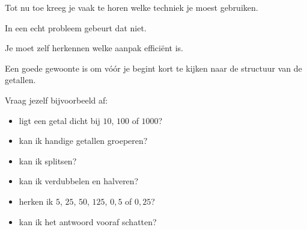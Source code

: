 \documentclass{ximera}
\begin{document}

Tot nu toe kreeg je vaak te horen welke techniek je moest gebruiken.

In een echt probleem gebeurt dat niet.

Je moet zelf herkennen welke aanpak efficiënt is.

Een goede gewoonte is om vóór je begint kort te kijken naar de structuur van
de getallen.

Vraag jezelf bijvoorbeeld af:

\begin{itemize}
    \item ligt een getal dicht bij \(10\), \(100\) of \(1000\)?
    \item kan ik handige getallen groeperen?
    \item kan ik splitsen?
    \item kan ik verdubbelen en halveren?
    \item herken ik \(5\), \(25\), \(50\), \(125\), \(0{,}5\) of \(0{,}25\)?
    \item kan ik het antwoord vooraf schatten?
\end{itemize}
\end{document}
